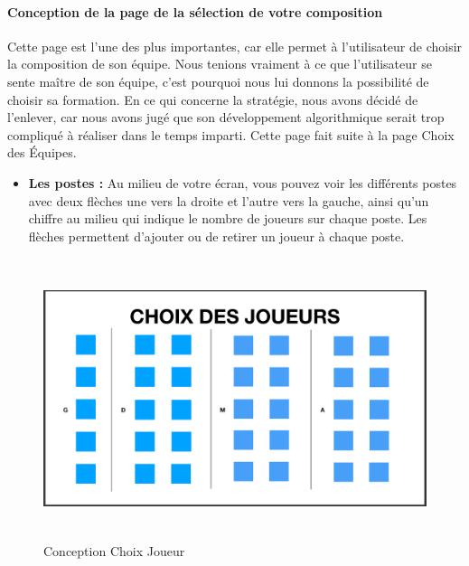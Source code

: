     \vspace{15pt}
    \vspace{15pt}

\paragraph{Conception de la page de la sélection de votre composition}
    Cette page est l'une des plus importantes, car elle permet à l'utilisateur de choisir la composition de son équipe. Nous tenions vraiment à ce que l'utilisateur se sente maître de son équipe, c'est pourquoi nous lui donnons la possibilité de choisir sa formation. En ce qui concerne la stratégie, nous avons décidé de l'enlever, car nous avons jugé que son développement algorithmique serait trop compliqué à réaliser dans le temps imparti. Cette page fait suite à la page Choix des Équipes.

    \vspace{15pt}

\begin{itemize}
    \item \textbf{Les postes :} 
        Au milieu de votre écran, vous pouvez voir les différents postes avec deux flèches une vers la droite et l'autre vers la gauche, ainsi qu'un chiffre au milieu qui indique le nombre de joueurs sur chaque poste. Les flèches permettent d'ajouter ou de retirer un joueur à chaque poste.
    \vspace{15pt}
\end{itemize}

\begin{figure}[h]
\centering
\includegraphics[width=12.82cm, height=8.2cm]{images/ConceptIHM4.png}
\caption{Conception Choix Joueur}
\label{fig:choixJoueur}
\end{figure}

